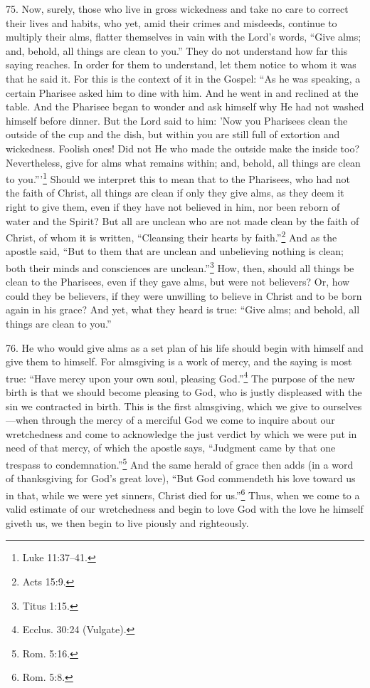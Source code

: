 
75. Now, surely, those who live in gross wickedness and take no care to correct their lives and habits, who yet, amid their crimes and misdeeds, continue to multiply their alms, flatter themselves in vain with the Lord's words, ``Give alms; and, behold, all things are clean to you.'' They do not understand how far this saying reaches. In order for them to understand, let them notice to whom it was that he said it. For this is the context of it in the Gospel: ``As he was speaking, a certain Pharisee asked him to dine with him. And he went in and reclined at the table. And the Pharisee began to wonder and ask himself why He had not washed himself before dinner. But the Lord said to him: 'Now you Pharisees clean the outside of the cup and the dish, but within you are still full of extortion and wickedness. Foolish ones! Did not He who made the outside make the inside too? Nevertheless, give for alms what remains within; and, behold, all things are clean to you.'''\footnote{Luke 11:37–41.} Should we interpret this to mean that to the Pharisees, who had not the faith of Christ, all things are clean if only they give alms, as they deem it right to give them, even if they have not believed in him, nor been reborn of water and the Spirit? But all are unclean who are not made clean by the faith of Christ, of whom it is written, ``Cleansing their hearts by faith.''\footnote{Acts 15:9.} And as the apostle said, ``But to them that are unclean and unbelieving nothing is clean; both their minds and consciences are unclean.''\footnote{Titus 1:15.} How, then, should all things be clean to the Pharisees, even if they gave alms, but were not believers? Or, how could they be believers, if they were unwilling to believe in Christ and to be born again in his grace? And yet, what they heard is true: ``Give alms; and behold, all things are clean to you.''

76. He who would give alms as a set plan of his life should begin with himself and give them to himself. For almsgiving is a work of mercy, and the saying is most true: ``Have mercy upon your own soul, pleasing God.''\footnote{Ecclus. 30:24 (Vulgate).} The purpose of the new birth is that we should become pleasing to God, who is justly displeased with the sin we contracted in birth. This is the first almsgiving, which we give to ourselves—when through the mercy of a merciful God we come to inquire about our wretchedness and come to acknowledge the just verdict by which we were put in need of that mercy, of which the apostle says, ``Judgment came by that one trespass to condemnation.''\footnote{Rom. 5:16.} And the same herald of grace then adds (in a word of thanksgiving for God's great love), ``But God commendeth his love toward us in that, while we were yet sinners, Christ died for us.''\footnote{Rom. 5:8.} Thus, when we come to a valid estimate of our wretchedness and begin to love God with the love he himself giveth us, we then begin to live piously and righteously.


